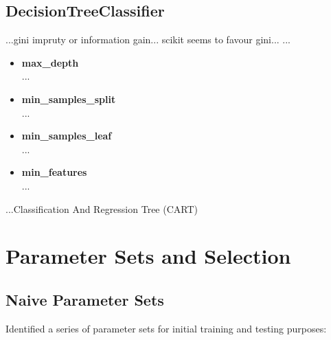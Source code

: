 \subsection{DecisionTreeClassifier}
...gini impruty or information gain... scikit seems to favour gini...
...

\begin{itemize}
    \item \textbf{max\_depth} \hfill\\
        ...
    \item \textbf{min\_samples\_split} \hfill\\
        ...
    \item \textbf{min\_samples\_leaf} \hfill\\
        ...
    \item \textbf{min\_features} \hfill\\
        ...
\end{itemize}

...Classification And Regression Tree (CART)





\section{Parameter Sets and Selection}
\subsection{Naive Parameter Sets}

Identified a series of parameter sets for initial training and testing purposes:

